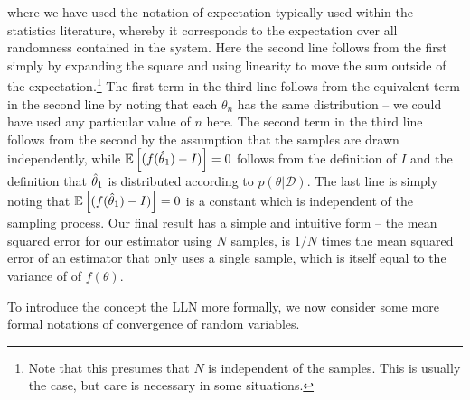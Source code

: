 where we have used the notation of expectation typically used within the statistics literature,
whereby it corresponds to the expectation over all randomness contained in the system.
Here the second line follows from the first simply by expanding the square and using linearity
to move the sum outside of the expectation.\footnote{Note that this presumes that $N$ is independent
	of the samples.  This is usually the case, but care is necessary in some situations.}
The first term in the third line follows from the equivalent term in the second line by noting that
each $\theta_n$ has the same distribution -- we could have used any particular value of $n$ here.
The second term in the third line follows from the second by the assumption that the samples are drawn
independently, while $\mathbb{E}\left[ (f(\hat{\theta}_1)-I)\right]=0$ follows from the definition of $I$
and the definition that $\hat{\theta}_1$ is distributed according to $p(\theta | \mathcal{D})$.  The last line
is simply noting that $\mathbb{E}\left[ (f(\hat{\theta}_1)-I)\right]=0$ is a constant which is independent of the
sampling process.  Our final result has a simple and intuitive form -- the mean squared error for
our estimator using $N$ samples, is $1/N$ times the mean squared error of an estimator that only uses
a single sample, which is itself equal to the variance of of $f(\theta)$.


To introduce the concept the LLN more formally, we now consider some more formal notations
of convergence of random variables.